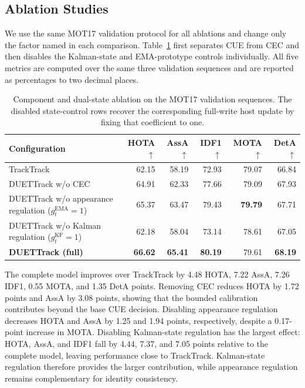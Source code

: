 \documentclass[a4paper,fleqn]{cas-sc}
\newcommand{\gm}{g_t^{\mathrm{KF}}}
\newcommand{\ga}{g_t^{\mathrm{EMA}}}
\begin{document}
\subsection{Ablation Studies}
We use the same MOT17 validation protocol for all ablations and change only the factor named in each comparison. Table~\ref{tab:component_ablation} first separates CUE from CEC and then disables the Kalman-state and EMA-prototype controls individually. All five metrics are computed over the same three validation sequences and are reported as percentages to two decimal places.

\begin{table}[pos=!ht]
\centering
\caption{Component and dual-state ablation on the MOT17 validation sequences. The disabled state-control rows recover the corresponding full-write host update by fixing that coefficient to one.}
\label{tab:component_ablation}
{\footnotesize
\begin{tabular*}{\textwidth}{@{\extracolsep{\fill}}lrrrrr@{}}
\toprule
Configuration & HOTA$\uparrow$ & AssA$\uparrow$ & IDF1$\uparrow$ & MOTA$\uparrow$ & DetA$\uparrow$ \\
\midrule
TrackTrack & 62.15 & 58.19 & 72.93 & 79.07 & 66.84 \\
DUETTrack w/o CEC & 64.91 & 62.33 & 77.66 & 79.09 & 67.93 \\
DUETTrack w/o appearance regulation ($\ga=1$) & 65.37 & 63.47 & 79.43 & \textbf{79.79} & 67.71 \\
DUETTrack w/o Kalman regulation ($\gm=1$) & 62.18 & 58.04 & 73.14 & 78.61 & 67.05 \\
\textbf{DUETTrack (full)} & \textbf{66.62} & \textbf{65.41} & \textbf{80.19} & 79.61 & \textbf{68.19} \\
\bottomrule
\end{tabular*}}
\end{table}

The complete model improves over TrackTrack by 4.48 HOTA, 7.22 AssA, 7.26 IDF1, 0.55 MOTA, and 1.35 DetA points. Removing CEC reduces HOTA by 1.72 points and AssA by 3.08 points, showing that the bounded calibration contributes beyond the base CUE decision. Disabling appearance regulation decreases HOTA and AssA by 1.25 and 1.94 points, respectively, despite a 0.17-point increase in MOTA. Disabling Kalman-state regulation has the largest effect: HOTA, AssA, and IDF1 fall by 4.44, 7.37, and 7.05 points relative to the complete model, leaving performance close to TrackTrack. Kalman-state regulation therefore provides the larger contribution, while appearance regulation remains complementary for identity consistency.
\end{document}
